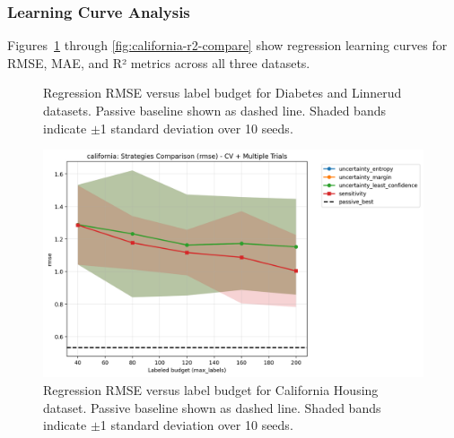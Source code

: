 \documentclass[conference]{IEEEtran}
\begin{document}
\subsubsection{Learning Curve Analysis}

Figures~\ref{fig:reg-compare} through \ref{fig:california-r2-compare} show regression learning curves for RMSE, MAE, and R² metrics across all three datasets.

\begin{figure}[t]
\centering
{}
\hfill
{}
\caption{Regression RMSE versus label budget for Diabetes and Linnerud datasets. Passive baseline shown as dashed line. Shaded bands indicate $\pm$1 standard deviation over 10 seeds.}
\label{fig:reg-compare}
\end{figure}

\begin{figure}[t]
\centering
\includegraphics[width=0.95\columnwidth]{figures/reg_california_comparison_rmse.png}
\caption{Regression RMSE versus label budget for California Housing dataset. Passive baseline shown as dashed line. Shaded bands indicate $\pm$1 standard deviation over 10 seeds.}
\label{fig:california-compare}
\end{figure}
\end{document}
